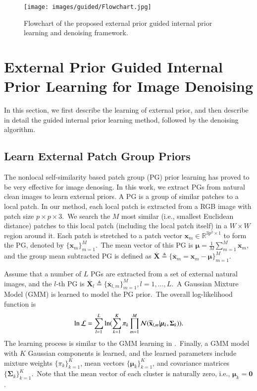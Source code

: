 \begin{figure}
\label{fig3-2}
\centering
\captionsetup{justification=centering,margin=0.1cm}
\texttt{[image: images/guided/Flowchart.jpg]}
\centering
\caption{Flowchart of the proposed external prior guided internal prior learning and denoising framework.}
\end{figure}



\section{External Prior Guided Internal Prior Learning for Image Denoising}

In this section, we first describe the learning of external prior, and then describe in detail the guided internal prior learning method, followed by the denoising algorithm.

\subsection{Learn External Patch Group Priors}

The nonlocal self-similarity based patch group (PG) prior learning \cite{pgpd} has proved to be very effective for image denosing. In this work, we extract PGs from natural clean images to learn external priors. A PG is a group of similar patches to a local patch. In our method, each local patch is extracted from a RGB image with patch size $p\times p \times 3$.\ We search the $M$ most similar (i.e., smallest Euclidean distance) patches to this local patch (including the local patch itself) in a $W\times W$ region around it. Each patch is stretched to a patch vector $\mathbf{x}_{m}\in \mathbb{R}^{3p^{2}\times1}$ to form the PG, denoted by $\{\mathbf{x}_{m}\}_{m=1}^{M}$.\ The mean vector of this PG is $\bm{\mu}=\frac{1}{M}\sum_{m=1}^{M}\mathbf{x}_{m}$, and the group mean subtracted PG is defined as $\mathbf{\overline{X}}\triangleq \{\mathbf{\overline{x}}_{m}=\mathbf{x}_{m}-\bm{\mu}\}_{m=1}^{M}$.

Assume that a number of $L$ PGs are extracted from a set of external natural images, and the $l$-th PG is $\mathbf{\overline{X}}_{l}\triangleq \{\mathbf{\overline{x}}_{l,m}\}_{m=1}^{M}, l=1,...,L$.\ A Gaussian Mixture Model (GMM) is learned to model the PG prior.\ The overall log-likelihood function is
\vspace{-2mm}
\begin{equation}\label{equ3-1}
\vspace{-2mm}
\begin{split}
\ln\mathcal{L}=\sum_{l=1}^{L} \ln(\sum_{k=1}^{K}\pi_{k}\prod_{m=1}^{M}\mathcal{N}(\mathbf{\overline{x}}_{l,m}|\bm{\mu}_{k},\bm{\Sigma}_{k})).
\end{split}
\end{equation}
The learning process is similar to the GMM learning in \cite{pgpd,epll}.\ Finally, a GMM model with $K$ Gaussian components is learned, and the learned parameters include mixture weights $\{\pi_{k}\}_{k=1}^{K}$, mean vectors $\{\bm{\mu}_{k}\}_{k=1}^{K}$, and covariance matrices $\{\bm{\Sigma}_{k}\}_{k=1}^{K}$.\ Note that the mean vector of each cluster is naturally zero, i.e., $\bm{\mu}_{k}=\bm{0}$.  

